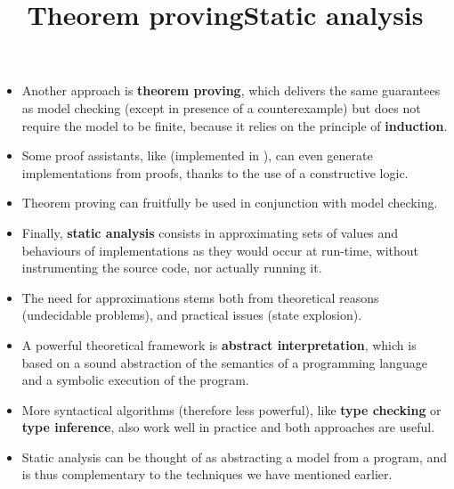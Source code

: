 \documentclass[wide]{slides}
\begin{document}
\begin{slide}
  \title{Theorem proving}

  \begin{itemize}

    \item Another approach is \textbf{theorem proving}, which delivers
      the same guarantees as model checking (except in presence of a
      counterexample) but does not require the model to be finite,
      because it relies on the principle of \textbf{induction}.

    \item Some proof assistants, like \Coq (implemented in \OCaml),
      can even generate implementations from proofs, thanks to the use
      of a constructive logic.

    \item Theorem proving can fruitfully be used in conjunction with
      model checking.

  \end{itemize}
\end{slide}

\begin{slide}
  \title{Static analysis}
  \begin{itemize}

    \item Finally, \textbf{static analysis} consists in approximating
      sets of values and behaviours of implementations as they would
      occur at run-time, without instrumenting the source code, nor
      actually running it.

    \item The need for approximations stems both from theoretical
      reasons (undecidable problems), and practical issues (state
      explosion).

    \item A powerful theoretical framework is \textbf{abstract
      interpretation}, which is based on a sound abstraction of the
      semantics of a programming language and a symbolic execution of
      the program.

    \item More syntactical algorithms (therefore less powerful), like
      \textbf{type checking} or \textbf{type inference}, also work
      well in practice and both approaches are useful.

    \item Static analysis can be thought of as abstracting a model
      from a program, and is thus complementary to the techniques we
      have mentioned earlier.

  \end{itemize}
\end{slide}
\end{document}
